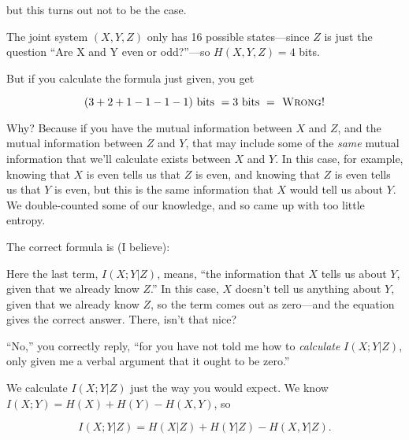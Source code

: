{ but this turns out not to be the case. 


 The joint system $(X,Y,Z)$ only has 16 possible states---since $Z$ is
just the question ``Are X and Y even or
odd?''---so $H(X,Y,Z) = 4$ bits.


 But if you calculate the formula just given, you get

\begin{equation*}
 (3 + 2 + 1 - 1 - 1 - 1) \text{ bits }= 3\text{ bits }=\textsc{ Wrong!}
\end{equation*}




 Why? Because if you have the mutual information between $X$ and $Z$,
and the mutual information between $Z$ and $Y$, that may include some of
the \textit{same} mutual information that we'll
calculate exists between $X$ and $Y$. In this case, for example, knowing
that $X$ is even tells us that $Z$ is even, and knowing that $Z$ is even
tells us that $Y$ is even, but this is the same information that $X$ would
tell us about $Y$. We double-counted some of our knowledge, and so came
up with too little entropy. 


 The correct formula is (I believe):




 Here the last term, $I(X;Y |Z)$, means,
``the information that $X$ tells us about $Y$, given that
we already know $Z$.'' In this case, $X$
doesn't tell us anything about $Y$, given that we already
know $Z$, so the term comes out as zero---and the equation gives the
correct answer. There, isn't that nice? 


 ``No,'' you correctly reply,
``for you have not told me how to \textit{calculate}
$I(X;Y|Z)$, only given me a verbal argument that it ought to be
zero.''


 We calculate $I(X;Y|Z)$ just the way you would expect. We
know $I(X;Y) = H(X) + H(Y) - H(X,Y)$, so

\begin{equation*}
  I(X;Y|Z) = H(X|Z) + H(Y|Z) - H(X,Y|Z).
\end{equation*}



}
